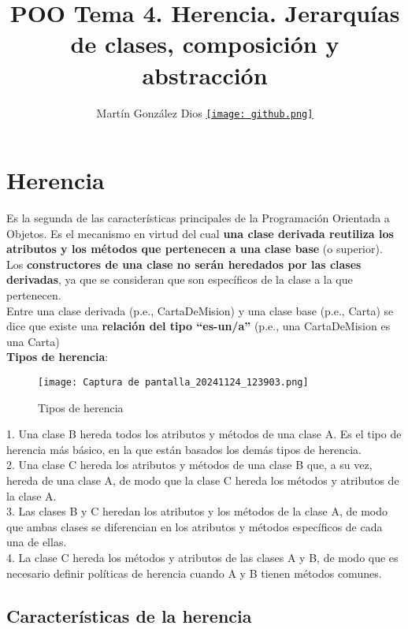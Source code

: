 \documentclass{article}
\title{POO Tema 4. Herencia. Jerarquías de clases, composición y abstracción}
\author{Martín González Dios 
\href{https://github.com/martindios}{\texttt{[image: github.png]}}}
\begin{document}
\maketitle

\section{Herencia}
Es la segunda de las características principales de la Programación Orientada a Objetos. Es el mecanismo en virtud del cual \textbf{una clase derivada reutiliza los atributos y los métodos que pertenecen a una clase base} (o superior). \\
Los \textbf{constructores de una clase no serán heredados por las clases derivadas}, ya que se consideran que son específicos de la clase a la que pertenecen. \\
Entre una clase derivada (p.e., CartaDeMision) y una clase base (p.e., Carta) se dice que existe una \textbf{relación del tipo “es-un/a”} (p.e., una CartaDeMision es una Carta) \\

\textbf{Tipos de herencia}:

\begin{wrapfigure}[]{}{0.4\linewidth}
    \centering
    \texttt{[image: Captura de pantalla\_20241124\_123903.png]}
    \caption{Tipos de herencia}
\end{wrapfigure}

1. Una clase B hereda todos los atributos y métodos de una clase A. Es el tipo de herencia más básico, en la que están basados los demás tipos de herencia. \\

2. Una clase C hereda los atributos y métodos de una clase B que, a su vez, hereda de una clase A, de modo que la clase C hereda los métodos y atributos de la clase A. \\

3. Las clases B y C heredan los atributos y los métodos de la clase A, de modo que ambas clases se diferencian en los atributos y métodos específicos de cada una de ellas. \\

4. La clase C hereda los métodos y atributos de las clases A y B, de modo que es necesario definir políticas de herencia cuando A y B tienen métodos comunes. \\

\newpage

\subsection{Características de la herencia}
\end{document}
